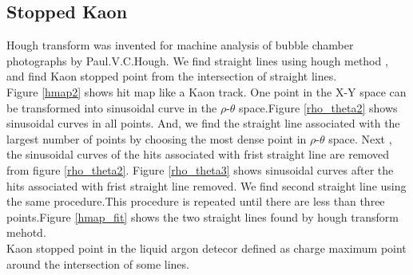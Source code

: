 \subsection{Stopped Kaon}
Hough transform was invented for machine analysis of bubble chamber photographs by Paul.V.C.Hough.\cite{3069654}
We find straight lines using hough method , and find Kaon stopped point from the intersection of straight lines.\\
Figure \ref{hmap2} shows hit map like a Kaon track.
One point in the X-Y space can be transformed into sinusoidal curve in the $\rho$-$\theta$ space.Figure \ref{rho_theta2} shows sinusoidal curves in all points.
And, we find the straight line associated with the largest number of points by choosing the most dense point in $\rho$-$\theta$ space.
Next , the sinusoidal curves of the hits associated with frist straight line are removed from figure \ref{rho_theta2}.
Figure \ref{rho_theta3} shows sinusoidal curves after the hits associated with frist straight line removed.
We find second straight line using the same procedure.This procedure is repeated until there are less than three points.Figure \ref{hmap_fit} shows the two straight lines found by hough transform mehotd.\\
Kaon stopped point in the liquid argon detecor defined as charge maximum point around the intersection of some lines.


